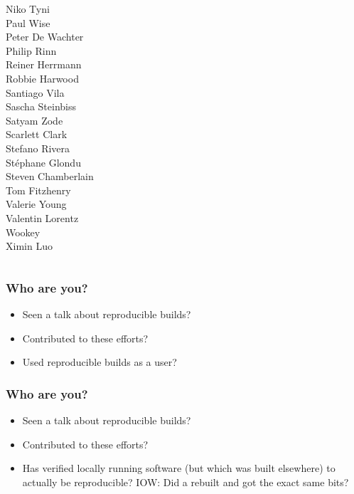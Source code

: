 \documentclass[14pt,aspectratio=169]{beamer}
\newif\ifplacelogo
\begin{document}
\begin{frame}
\begin{center}
\begin{columns}
    Niko Tyni \\
    {Paul Wise} \\
    Peter De Wachter \\
    Philip Rinn \\
    {Reiner Herrmann} \\
    Robbie Harwood \\
    {Santiago Vila} \\
    {Sascha Steinbiss} \\
    {Satyam Zode} \\
    {Scarlett Clark} \\
    {Stefano Rivera} \\
    {Stéphane Glondu} \\
    {Steven Chamberlain} \\
    Tom Fitzhenry \\
    {Valerie Young} \\
    Valentin Lorentz \\
    {Wookey} \\
    {Ximin Luo} \\
  \end{columns}
 \end{center}
\end{frame}


\placelogofalse

\begin{frame}
 \frametitle{Who are you?}
 \begin{itemize}
  \item<2-4> Seen a talk about reproducible builds?
  \item<3-4> Contributed to these efforts?
  \item<4> Used reproducible builds as a user?
 \end{itemize}
\end{frame}

\begin{frame}
 \frametitle{Who are you?}
 \begin{itemize}
  \item Seen a talk about reproducible builds?
  \item Contributed to these efforts?
  \item Has verified locally running software (but which was built elsewhere) to actually be reproducible? IOW: Did a rebuilt and got the exact same bits?
 \end{itemize}
\end{frame}
\end{document}
